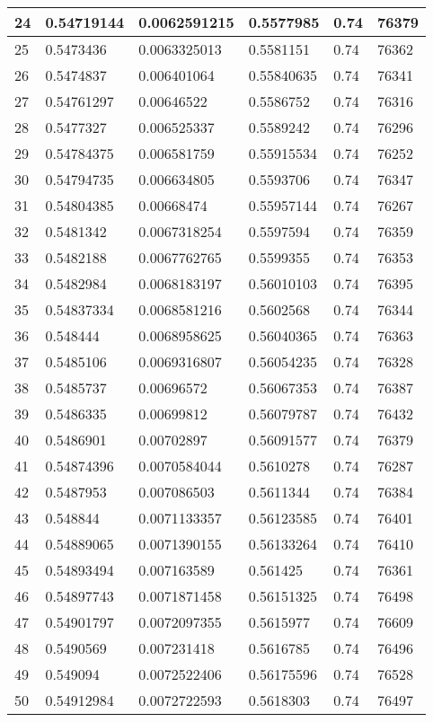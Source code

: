 \begin{longtable}{|l|l|l|l|l|l|}
24 & 0.54719144 & 0.0062591215 & 0.5577985 & 0.74 & 76379 \\ \hline 
25 & 0.5473436 & 0.0063325013 & 0.5581151 & 0.74 & 76362 \\ \hline 
26 & 0.5474837 & 0.006401064 & 0.55840635 & 0.74 & 76341 \\ \hline 
27 & 0.54761297 & 0.00646522 & 0.5586752 & 0.74 & 76316 \\ \hline 
28 & 0.5477327 & 0.006525337 & 0.5589242 & 0.74 & 76296 \\ \hline 
29 & 0.54784375 & 0.006581759 & 0.55915534 & 0.74 & 76252 \\ \hline 
30 & 0.54794735 & 0.006634805 & 0.5593706 & 0.74 & 76347 \\ \hline 
31 & 0.54804385 & 0.00668474 & 0.55957144 & 0.74 & 76267 \\ \hline 
32 & 0.5481342 & 0.0067318254 & 0.5597594 & 0.74 & 76359 \\ \hline 
33 & 0.5482188 & 0.0067762765 & 0.5599355 & 0.74 & 76353 \\ \hline 
34 & 0.5482984 & 0.0068183197 & 0.56010103 & 0.74 & 76395 \\ \hline 
35 & 0.54837334 & 0.0068581216 & 0.5602568 & 0.74 & 76344 \\ \hline 
36 & 0.548444 & 0.0068958625 & 0.56040365 & 0.74 & 76363 \\ \hline 
37 & 0.5485106 & 0.0069316807 & 0.56054235 & 0.74 & 76328 \\ \hline 
38 & 0.5485737 & 0.00696572 & 0.56067353 & 0.74 & 76387 \\ \hline 
39 & 0.5486335 & 0.00699812 & 0.56079787 & 0.74 & 76432 \\ \hline 
40 & 0.5486901 & 0.00702897 & 0.56091577 & 0.74 & 76379 \\ \hline 
41 & 0.54874396 & 0.0070584044 & 0.5610278 & 0.74 & 76287 \\ \hline 
42 & 0.5487953 & 0.007086503 & 0.5611344 & 0.74 & 76384 \\ \hline 
43 & 0.548844 & 0.0071133357 & 0.56123585 & 0.74 & 76401 \\ \hline 
44 & 0.54889065 & 0.0071390155 & 0.56133264 & 0.74 & 76410 \\ \hline 
45 & 0.54893494 & 0.007163589 & 0.561425 & 0.74 & 76361 \\ \hline 
46 & 0.54897743 & 0.0071871458 & 0.56151325 & 0.74 & 76498 \\ \hline 
47 & 0.54901797 & 0.0072097355 & 0.5615977 & 0.74 & 76609 \\ \hline 
48 & 0.5490569 & 0.007231418 & 0.5616785 & 0.74 & 76496 \\ \hline 
49 & 0.549094 & 0.0072522406 & 0.56175596 & 0.74 & 76528 \\ \hline 
50 & 0.54912984 & 0.0072722593 & 0.5618303 & 0.74 & 76497 \\ \hline 
\end{longtable}